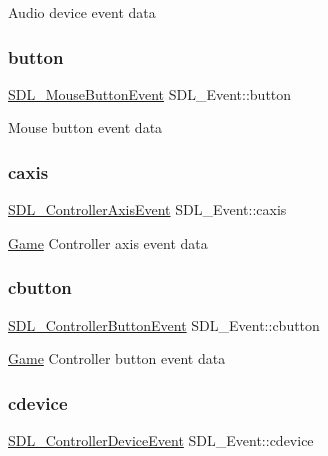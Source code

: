 Audio device event data \mbox{\label{union_s_d_l___event_ab6da2fa2687e5f849f270adecc64785f}} 
\subsubsection{\texorpdfstring{button}{button}}
{\footnotesize\ttfamily \mbox{\hyperlink{struct_s_d_l___mouse_button_event}{S\+D\+L\+\_\+\+Mouse\+Button\+Event}} S\+D\+L\+\_\+\+Event\+::button}

Mouse button event data \mbox{\label{union_s_d_l___event_aa8f6df0f2716fae56204b12ab4a4c289}} 
\subsubsection{\texorpdfstring{caxis}{caxis}}
{\footnotesize\ttfamily \mbox{\hyperlink{struct_s_d_l___controller_axis_event}{S\+D\+L\+\_\+\+Controller\+Axis\+Event}} S\+D\+L\+\_\+\+Event\+::caxis}

\mbox{\hyperlink{class_game}{Game}} Controller axis event data \mbox{\label{union_s_d_l___event_aee2b5671c8dcdb447023715cc21593cb}} 
\subsubsection{\texorpdfstring{cbutton}{cbutton}}
{\footnotesize\ttfamily \mbox{\hyperlink{struct_s_d_l___controller_button_event}{S\+D\+L\+\_\+\+Controller\+Button\+Event}} S\+D\+L\+\_\+\+Event\+::cbutton}

\mbox{\hyperlink{class_game}{Game}} Controller button event data \mbox{\label{union_s_d_l___event_ad3beed01e690b885728e0b0e1d636378}} 
\subsubsection{\texorpdfstring{cdevice}{cdevice}}
{\footnotesize\ttfamily \mbox{\hyperlink{struct_s_d_l___controller_device_event}{S\+D\+L\+\_\+\+Controller\+Device\+Event}} S\+D\+L\+\_\+\+Event\+::cdevice}

